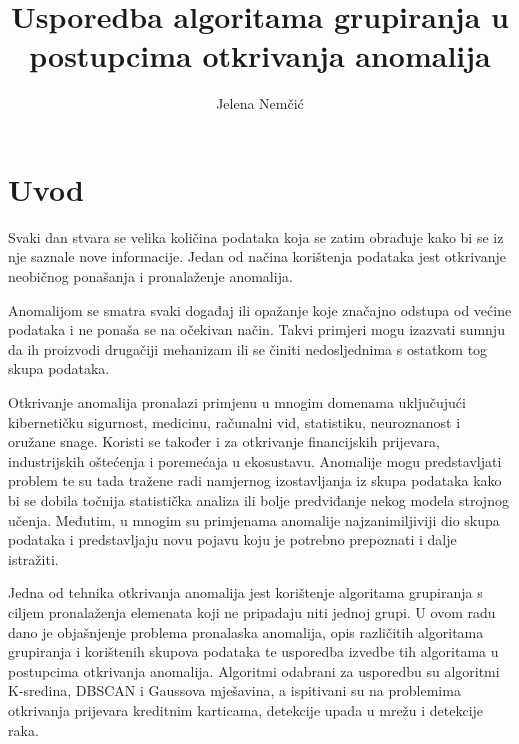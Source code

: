\documentclass[utf8, diplomski, numeric]{fer}
\begin{document}

\title{Usporedba algoritama grupiranja u postupcima otkrivanja anomalija}

\author{Jelena Nemčić}

\maketitle



\zahvala{}

\tableofcontents

\chapter{Uvod}

Svaki dan stvara se velika količina podataka koja se zatim obrađuje kako bi se iz nje saznale nove informacije. Jedan od načina korištenja podataka jest otkrivanje neobičnog ponašanja i pronalaženje anomalija.

Anomalijom se smatra svaki događaj ili opažanje koje značajno odstupa od većine podataka i ne ponaša se na očekivan način. Takvi primjeri mogu izazvati sumnju da ih proizvodi drugačiji mehanizam ili se činiti nedosljednima s ostatkom tog skupa podataka.

Otkrivanje anomalija pronalazi primjenu u mnogim domenama uključujući kibernetičku sigurnost, medicinu, računalni vid, statistiku, neuroznanost i oružane snage. Koristi se također i za otkrivanje financijskih prijevara, industrijskih oštećenja i poremećaja u ekosustavu. Anomalije mogu predstavljati problem te su tada tražene radi namjernog izostavljanja iz skupa podataka kako bi se dobila točnija statistička analiza ili bolje predviđanje nekog modela strojnog učenja. Međutim, u mnogim su primjenama anomalije najzanimiljiviji dio skupa podataka i predstavljaju novu pojavu koju je potrebno prepoznati i dalje istražiti.

Jedna od tehnika otkrivanja anomalija jest korištenje algoritama grupiranja s ciljem pronalaženja elemenata koji ne pripadaju niti jednoj grupi. U ovom radu dano je objašnjenje problema pronalaska anomalija, opis različitih algoritama grupiranja i korištenih skupova podataka te usporedba izvedbe tih algoritama u postupcima otkrivanja anomalija. Algoritmi odabrani za usporedbu su algoritmi K-sredina, DBSCAN i Gaussova mješavina, a ispitivani su na problemima otkrivanja prijevara kreditnim karticama, detekcije upada u mrežu i detekcije raka.
\end{document}
